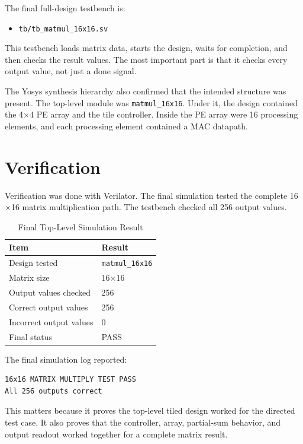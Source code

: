 \documentclass[conference]{IEEEtran}
\begin{document}
The final full-design testbench is:

\begin{itemize}
\item \texttt{tb/tb\_matmul\_16x16.sv}
\end{itemize}

This testbench loads matrix data, starts the design, waits for completion, and then checks the result values. The most important part is that it checks every output value, not just a done signal.

The Yosys synthesis hierarchy also confirmed that the intended structure was present. The top-level module was \texttt{matmul\_16x16}. Under it, the design contained the 4$\times$4 PE array and the tile controller. Inside the PE array were 16 processing elements, and each processing element contained a MAC datapath.

\section{Verification}

Verification was done with Verilator. The final simulation tested the complete 16$\times$16 matrix multiplication path. The testbench checked all 256 output values.

\begin{table}[h]
\centering
\caption{Final Top-Level Simulation Result}
\label{tab:sim}
\begin{tabular}{ll}
\toprule
Item & Result \\
\midrule
Design tested & \texttt{matmul\_16x16} \\
Matrix size & 16$\times$16 \\
Output values checked & 256 \\
Correct output values & 256 \\
Incorrect output values & 0 \\
Final status & PASS \\
\bottomrule
\end{tabular}
\end{table}

The final simulation log reported:

\begin{verbatim}
16x16 MATRIX MULTIPLY TEST PASS
All 256 outputs correct
\end{verbatim}

This matters because it proves the top-level tiled design worked for the directed test case. It also proves that the controller, array, partial-sum behavior, and output readout worked together for a complete matrix result.
\end{document}
